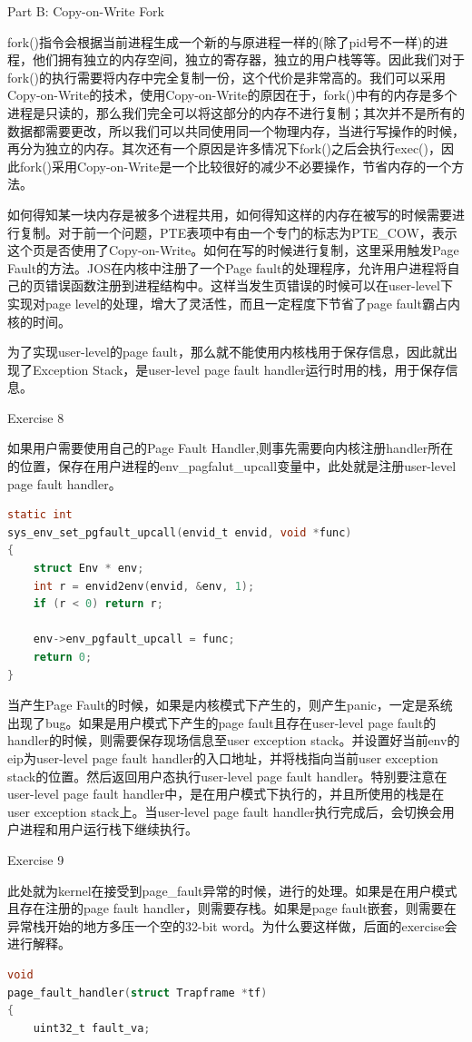 \documentclass[GBK,winfonts,a4paper,10pt]{ctexart}
\begin{document}
\begin{section}{Part B: Copy-on-Write Fork}
\par
fork()指令会根据当前进程生成一个新的与原进程一样的(除了pid号不一样)的进程，他们拥有独立的内存空间，独立的寄存器，独立的用户栈等等。因此我们对于fork()的执行需要将内存中完全复制一份，这个代价是非常高的。我们可以采用Copy-on-Write的技术，使用Copy-on-Write的原因在于，fork()中有的内存是多个进程是只读的，那么我们完全可以将这部分的内存不进行复制；其次并不是所有的数据都需要更改，所以我们可以共同使用同一个物理内存，当进行写操作的时候，再分为独立的内存。其次还有一个原因是许多情况下fork()之后会执行exec()，因此fork()采用Copy-on-Write是一个比较很好的减少不必要操作，节省内存的一个方法。
\par
如何得知某一块内存是被多个进程共用，如何得知这样的内存在被写的时候需要进行复制。对于前一个问题，PTE表项中有由一个专门的标志为PTE\_COW，表示这个页是否使用了Copy-on-Write。如何在写的时候进行复制，这里采用触发Page Fault的方法。JOS在内核中注册了一个Page fault的处理程序，允许用户进程将自己的页错误函数注册到进程结构中。这样当发生页错误的时候可以在user-level下实现对page level的处理，增大了灵活性，而且一定程度下节省了page fault霸占内核的时间。
\par
为了实现user-level的page fault，那么就不能使用内核栈用于保存信息，因此就出现了Exception Stack，是user-level page fault handler运行时用的栈，用于保存信息。

\begin{subsection}{Exercise 8}
\par
如果用户需要使用自己的Page Fault Handler,则事先需要向内核注册handler所在的位置，保存在用户进程的env\_pagfalut\_upcall变量中，此处就是注册user-level page fault handler。
\begin{lstlisting}[language=C]
static int
sys_env_set_pgfault_upcall(envid_t envid, void *func)
{
	struct Env * env;
	int r = envid2env(envid, &env, 1);
	if (r < 0) return r;

	env->env_pgfault_upcall = func;
	return 0;
}
\end{lstlisting}
\end{subsection}

\par
当产生Page Fault的时候，如果是内核模式下产生的，则产生panic，一定是系统出现了bug。如果是用户模式下产生的page fault且存在user-level page fault的handler的时候，则需要保存现场信息至user exception stack。并设置好当前env的eip为user-level page fault handler的入口地址，并将栈指向当前user exception stack的位置。然后返回用户态执行user-level page fault handler。特别要注意在user-level page fault handler中，是在用户模式下执行的，并且所使用的栈是在user exception stack上。当user-level page fault handler执行完成后，会切换会用户进程和用户运行栈下继续执行。
\begin{subsection}{Exercise 9}
\par
此处就为kernel在接受到page\_fault异常的时候，进行的处理。如果是在用户模式且存在注册的page fault handler，则需要存栈。如果是page fault嵌套，则需要在异常栈开始的地方多压一个空的32-bit word。为什么要这样做，后面的exercise会进行解释。
\begin{lstlisting}[language=C]
void
page_fault_handler(struct Trapframe *tf)
{
	uint32_t fault_va;


\end{lstlisting}
\end{subsection}
\end{section}
\end{document}
